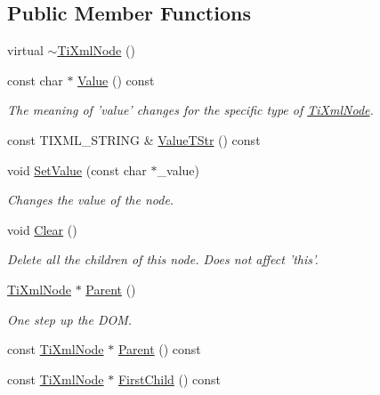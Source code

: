 \subsection*{Public Member Functions}
\begin{DoxyCompactItemize}
\item 
virtual \hyperlink{classTiXmlNode_a027a76cccd359c831ee4024b58c49625}{$\sim$TiXmlNode} ()
\item 
const char $\ast$ \hyperlink{classTiXmlNode_a77943eb90d12c2892b1337a9f5918b41}{Value} () const 
\begin{DoxyCompactList}\small\item\em The meaning of 'value' changes for the specific type of \hyperlink{classTiXmlNode}{TiXmlNode}. \item\end{DoxyCompactList}\item 
const TIXML\_\-STRING \& \hyperlink{classTiXmlNode_a83ece13d2ea66dac66e0b21332229239}{ValueTStr} () const 
\item 
void \hyperlink{classTiXmlNode_a2a38329ca5d3f28f98ce932b8299ae90}{SetValue} (const char $\ast$\_\-value)
\begin{DoxyCompactList}\small\item\em Changes the value of the node. \item\end{DoxyCompactList}\item 
void \hyperlink{classTiXmlNode_a708e7f953df61d4d2d12f73171550a4b}{Clear} ()
\begin{DoxyCompactList}\small\item\em Delete all the children of this node. Does not affect 'this'. \item\end{DoxyCompactList}\item 
\hyperlink{classTiXmlNode}{TiXmlNode} $\ast$ \hyperlink{classTiXmlNode_ab643043132ffd794f8602685d34a982e}{Parent} ()
\begin{DoxyCompactList}\small\item\em One step up the DOM. \item\end{DoxyCompactList}\item 
const \hyperlink{classTiXmlNode}{TiXmlNode} $\ast$ \hyperlink{classTiXmlNode_a78878709e53066f06eb4fcbcdd3a5260}{Parent} () const 
\item 
const \hyperlink{classTiXmlNode}{TiXmlNode} $\ast$ \hyperlink{classTiXmlNode_a44c8eee26bbe2d1b2762038df9dde2f0}{FirstChild} () const 

\end{DoxyCompactItemize}
